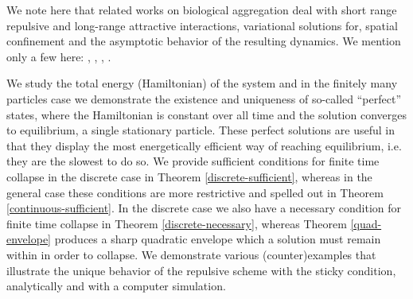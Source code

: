\documentclass[11pt]{article}
\numberwithin{equation}{section}
\begin{document}
     We note here that related works on biological aggregation deal with short range repulsive and long-range attractive interactions, variational solutions for, spatial confinement and the asymptotic behavior of the resulting dynamics. We mention only a few here: \cite{Balague}, \cite{Carrilloetal}, \cite{Fet-Huang}, \cite{Frank}. 
     
     We study the total energy (Hamiltonian) of the system and in the finitely many particles case we demonstrate the existence and uniqueness of so-called ``perfect'' states, where the Hamiltonian is constant over all time and the solution converges to equilibrium,  a single stationary particle. These perfect solutions are useful in that they display the most energetically efficient way of reaching equilibrium, i.e. they are the slowest to do so. We provide sufficient conditions for finite time collapse in the discrete case in Theorem \ref{discrete-sufficient}, whereas in the general case these conditions are more restrictive and spelled out in Theorem \ref{continuous-sufficient}. In the discrete case we also have a necessary condition for finite time collapse in Theorem \ref{discrete-necessary}, whereas Theorem \ref{quad-envelope} produces a sharp quadratic envelope which a solution must remain within in order to collapse. We demonstrate various (counter)examples that illustrate the unique behavior of the repulsive scheme with the sticky condition, analytically and with a computer simulation. 
\end{document}
